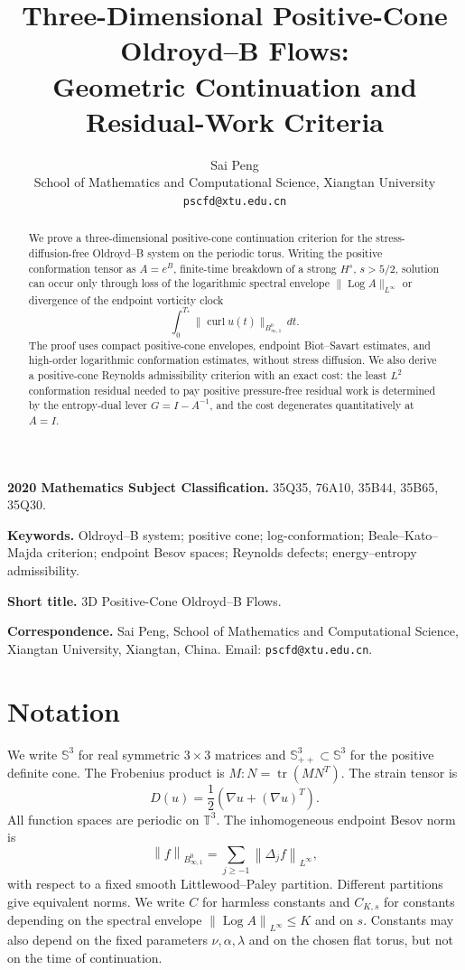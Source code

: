 \documentclass[11pt]{article}
\title{Three-Dimensional Positive-Cone Oldroyd--B Flows:\\
Geometric Continuation and Residual-Work Criteria}
\author{Sai Peng\\
School of Mathematics and Computational Science, Xiangtan University\\
\texttt{pscfd@xtu.edu.cn}}
\date{}
\numberwithin{equation}{section}
\newcommand{\T}{\mathbb T}
\newcommand{\Spp}{\mathbb S_{++}}
\newcommand{\Sym}{\mathbb S}
\newcommand{\tr}{\operatorname{tr}}
\newcommand{\Log}{\operatorname{Log}}
\newcommand{\norm}[1]{\left\lVert #1\right\rVert}
\begin{document}
\maketitle

\begin{abstract}
We prove a three-dimensional positive-cone continuation criterion for the
stress-diffusion-free Oldroyd--B system on the periodic torus.  Writing the
positive conformation tensor as \(A=e^B\), finite-time breakdown of a strong
\(H^s\), \(s>5/2\), solution can occur only through loss of the logarithmic
spectral envelope \(\|\Log A\|_{L^\infty}\) or divergence of the endpoint
vorticity clock
\[
  \int_0^{T_*}\|\operatorname{curl}u(t)\|_{B^0_{\infty,1}}\,dt .
\]
The proof uses compact positive-cone envelopes, endpoint Biot--Savart
estimates, and high-order logarithmic conformation estimates, without stress
diffusion.  We also derive a positive-cone Reynolds admissibility criterion
with an exact cost: the least \(L^2\) conformation residual needed to pay positive
pressure-free residual work is determined by the entropy-dual lever
\(G=I-A^{-1}\), and the cost degenerates quantitatively at \(A=I\).
\end{abstract}

\noindent\textbf{2020 Mathematics Subject Classification.}
35Q35, 76A10, 35B44, 35B65, 35Q30.

\noindent\textbf{Keywords.}
Oldroyd--B system; positive cone; log-conformation; Beale--Kato--Majda
criterion; endpoint Besov spaces; Reynolds defects; energy--entropy
admissibility.

\noindent\textbf{Short title.}
3D Positive-Cone Oldroyd--B Flows.

\noindent\textbf{Correspondence.}
Sai Peng, School of Mathematics and Computational Science, Xiangtan
University, Xiangtan, China.
Email: \texttt{pscfd@xtu.edu.cn}.

\section*{Notation}

We write \(\Sym^3\) for real symmetric \(3\times3\) matrices and
\(\Spp^3\subset\Sym^3\) for the positive definite cone.  The Frobenius product
is \(M:N=\tr(MN^T)\).  The strain tensor is
\[
  D(u)=\frac12(\nabla u+(\nabla u)^T).
\]
All function spaces are periodic on \(\T^3\).  The inhomogeneous endpoint
Besov norm is
\[
  \norm{f}_{B^0_{\infty,1}}
  =
  \sum_{j\ge -1}\norm{\Delta_jf}_{L^\infty},
\]
with respect to a fixed smooth Littlewood--Paley partition.  Different
partitions give equivalent norms.  We write \(C\) for harmless constants and
\(C_{K,s}\) for constants depending on the spectral envelope
\(\norm{\Log A}_{L^\infty}\le K\) and on \(s\).  Constants may also depend on
the fixed parameters \(\nu,\alpha,\lambda\) and on the chosen flat torus, but
not on the time of continuation.
\end{document}
